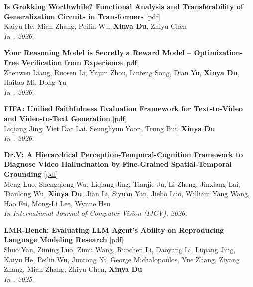\begin{enumerate}[{[}1{]},leftmargin=*]
\parbox{\textwidth}{
\item
{\bf Is Grokking Worthwhile? Functional Analysis and Transferability of Generalization Circuits in Transformers}
\href{https://arxiv.org/abs/2601.09049}{{{[pdf]}}} \\
Kaiyu He, Mian Zhang, Peilin Wu, \textbf{Xinya Du}, Zhiyu Chen \\
{\it In \ACLfinding, 2026.} \\
}

\parbox{\textwidth}{
\item
{\bf Your Reasoning Model is Secretly a Reward Model -- Optimization-Free Verification from Experience}
\href{https://arxiv.org/pdf/2510.01591}{{{[pdf]}}} \\
Zhenwen Liang, Ruosen Li, Yujun Zhou, Linfeng Song, Dian Yu, \textbf{Xinya Du}, Haitao Mi, Dong Yu \\
{\it In \ACL, 2026.} \\
}

\parbox{\textwidth}{
\item
{\bf FIFA: Unified Faithfulness Evaluation Framework for Text-to-Video and Video-to-Text Generation}
\href{https://arxiv.org/abs/2507.06523}{{{[pdf]}}} \\
Liqiang Jing, Viet Dac Lai, Seunghyun Yoon, Trung Bui, \textbf{Xinya Du} \\
{\it In \ACLfinding, 2026.} \\
}

\parbox{\textwidth}{
\item
{\bf Dr.V: A Hierarchical Perception-Temporal-Cognition Framework to Diagnose Video Hallucination by Fine-Grained Spatial-Temporal Grounding}
\href{https://arxiv.org/abs/2509.25771}{{{[pdf]}}} \\
Meng Luo, Shengqiong Wu, Liqiang Jing, Tianjie Ju, Li Zheng, Jinxiang Lai, Tianlong Wu, \textbf{Xinya Du}, Jian Li, Siyuan Yan, Jiebo Luo, William Yang Wang, Hao Fei, Mong-Li Lee, Wynne Hsu \\
{\it In International Journal of Computer Vision (IJCV), 2026.} \\
}

\parbox{\textwidth}{
\item
{\bf LMR-Bench: Evaluating LLM Agent’s Ability on Reproducing Language Modeling Research} 
\href{https://aclanthology.org/2025.emnlp-main.314.pdf}{{{[pdf]}}} \\
Shuo Yan, Ziming Luo, Zimu Wang, Ruochen Li, Daoyang Li, Liqiang Jing, Kaiyu He, Peilin Wu, Juntong Ni, George Michalopoulos, Yue Zhang, Ziyang Zhang, Mian Zhang, Zhiyu Chen, \textbf{Xinya Du} \\
{\it In \EMNLP, 2025.} \\
}


\end{enumerate}
